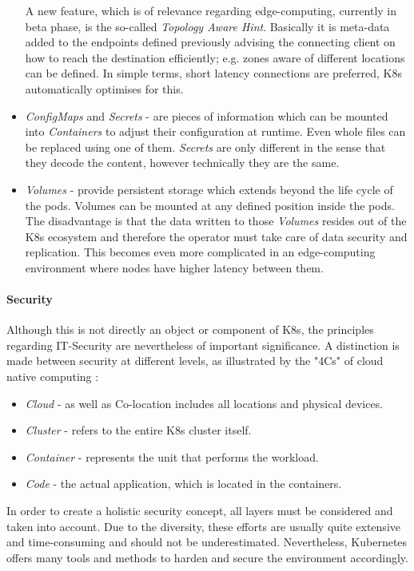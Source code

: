 \documentclass[MIC,Master,english]{twbook}%
\begin{document}
\begin{itemize}
    A new feature, which is of relevance regarding edge-computing, currently in beta phase, is the so-called \textit{Topology Aware Hint}. Basically it is meta-data added to the endpoints defined previously advising the connecting client on how to reach the destination efficiently; e.g. zones aware of different locations can be defined. In simple terms, short latency connections are preferred, \ac{K8s} automatically optimises for this.
    \item \textit{ConfigMaps} and \textit{Secrets} - are pieces of information which can be mounted into \textit{Containers} to adjust their configuration at runtime. Even whole files can be replaced using one of them. \textit{Secrets} are only different in the sense that they decode the content, however technically they are the same.
    \item \textit{Volumes} - provide persistent storage which extends beyond the life cycle of the pods. Volumes can be mounted at any defined position inside the pods. The disadvantage is that the data written to those \textit{Volumes} resides out of the \ac{K8s} ecosystem and therefore the operator must take care of data security and replication. This becomes even more complicated in an edge-computing environment where nodes have higher latency between them.
\end{itemize}

\paragraph{Security} Although this is not directly an object or component of \ac{K8s}, the principles regarding IT-Security are nevertheless of important significance. A distinction is made between security at different levels, as illustrated by the "4Cs" of cloud native computing \cite{k8s-4cs}:

\begin{itemize}
    \item \textit{Cloud} - as well as Co-location includes all locations and physical devices.
    \item \textit{Cluster} - refers to the entire \ac{K8s} cluster itself.
    \item \textit{Container} - represents the unit that performs the workload.
    \item \textit{Code} - the actual application, which is located in the containers.
\end{itemize}

In order to create a holistic security concept, all layers must be considered and taken into account. Due to the diversity, these efforts are usually quite extensive and time-consuming and should not be underestimated. Nevertheless, Kubernetes offers many tools and methods to harden and secure the environment accordingly.
\end{document}
